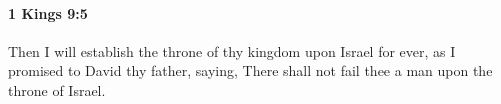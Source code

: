 
		\paragraph{1 Kings 9:5} %
			\label{1KINGS-9-5}

			Then I will establish the throne of thy kingdom upon Israel for ever, as I promised to David thy father, saying, There shall not fail thee a man upon the throne of Israel.


